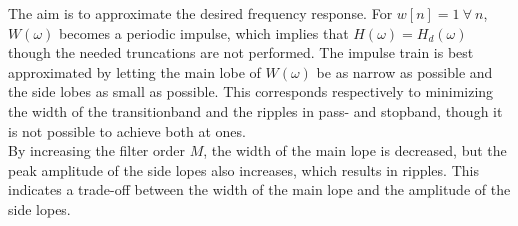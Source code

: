 %
The aim is to approximate the desired frequency response. For $w[n]=1 \ \forall \ n$, $W(\omega)$ becomes a periodic impulse, which implies that $H(\omega) = H_d(\omega)$ though the needed truncations are not performed. The impulse train is best approximated by letting the main lobe of $W(\omega)$ be as narrow as possible and the side lobes as small as possible. This corresponds respectively to minimizing the width of the transitionband and the ripples in pass- and stopband, though it is not possible to achieve both at ones.\\
By increasing the filter order $M$, the width of the main lope is decreased, but the peak amplitude of the side lopes also increases, which results in ripples. This indicates a trade-off between the width of the main lope and the amplitude of the side lopes. \\

